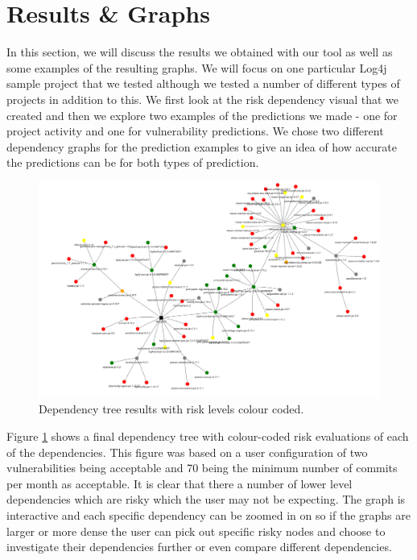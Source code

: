 \documentclass[conference]{IEEEtran}
\begin{document}
\section{Results \& Graphs}
In this section, we will discuss the results we obtained with our tool as well as some examples of the resulting graphs. We will focus on one particular Log4j sample project \cite{noauthor_logging-log4j-sampleslog4j-server_nodate} that we tested although we tested a number of different types of projects in addition to this. We first look at the risk dependency visual that we created and then we explore two examples of the predictions we made - one for project activity and one for vulnerability predictions. We chose two different dependency graphs for the prediction examples to give an idea of how accurate the predictions can be for both types of prediction. 

\begin{figure}[H]
    \centering
    \includegraphics[width=1\linewidth]{dependency.png}
    \caption{Dependency tree results with risk levels colour coded.} 
    \label{fig:tree}
\end{figure}

Figure \ref{fig:tree} shows a final dependency tree with colour-coded risk evaluations of each of the dependencies. This figure was based on a user configuration of two vulnerabilities being acceptable and 70 being the minimum number of commits per month as acceptable. It is clear that there a number of lower level dependencies which are risky which the user may not be expecting. The graph is interactive and each specific dependency can be zoomed in on so if the graphs are larger or more dense the user can pick out specific risky nodes and choose to investigate their dependencies further or even compare different dependencies. 
\end{document}
